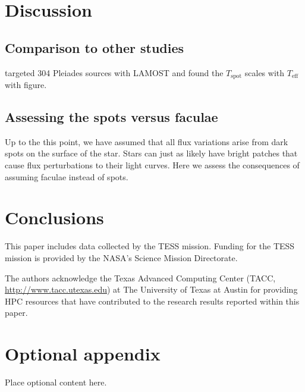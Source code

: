 \documentclass[twocolumn]{aastex631}
\begin{document}
\section{Discussion}

\subsection{Comparison to other studies}
\citet{2016MNRAS.463.2494F} targeted 304 Pleiades sources with LAMOST and found the $T_{\mathrm{spot}}$ scales with $T_{\mathrm{eff}}$ with figure.

\subsection{Assessing the spots versus faculae}
Up to the this point, we have assumed that all flux variations arise from dark spots on the surface of the star. Stars can just as likely have bright patches that cause flux perturbations to their light curves. Here we assess the consequences of assuming faculae instead of spots.

\section{Conclusions}

\begin{acknowledgements}
  This paper includes data collected by the TESS mission. Funding for the TESS mission is provided by the NASA's Science Mission Directorate.

  The authors acknowledge the Texas Advanced Computing Center (TACC, \url{http://www.tacc.utexas.edu}) at The University of Texas at Austin for providing HPC resources that have contributed to the research results reported within this paper.
\end{acknowledgements}

\clearpage








\clearpage

\appendix
\restartappendixnumbering

\section{Optional appendix} \label{appendix:tools}

Place optional content here.
\end{document}
